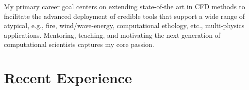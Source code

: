 \documentclass[letterpaper]{twentysecondcv_spd} %
\begin{document}
My primary career goal centers on extending state-of-the art in CFD methods 
to facilitate the advanced deployment of credible tools that support a wide range 
of atypical, e.g., fire, wind/wave-energy, computational ethology, etc., multi-physics applications. Mentoring, 
teaching, and motivating the next generation of computational scientists captures my core passion.


\newpage %



\section{Recent Experience}
\end{document}
